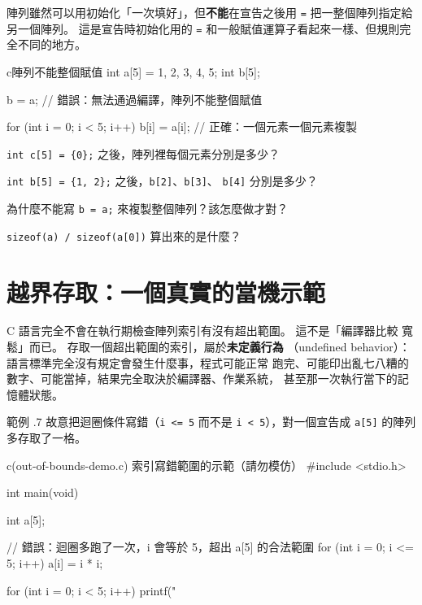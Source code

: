 陣列雖然可以用初始化「一次填好」，但\textbf{不能}在宣告之後用
\texttt{=} 把一整個陣列指定給另一個陣列。 這是宣告時初始化用的
\texttt{=} 和一般賦值運算子看起來一樣、但規則完全不同的地方。

\begin{code}{c}{陣列不能整個賦值}
int a[5] = {1, 2, 3, 4, 5};
int b[5];

b = a;   // 錯誤：無法通過編譯，陣列不能整個賦值

for (int i = 0; i < 5; i++) {
    b[i] = a[i];   // 正確：一個元素一個元素複製
}
\end{code}


\begin{drills}[label=drills:array-init-limits]
\item \texttt{int c[5] = \{0\};} 之後，陣列裡每個元素分別是多少？
\item \texttt{int b[5] = \{1, 2\};} 之後，\texttt{b[2]}、\texttt{b[3]}、
\texttt{b[4]} 分別是多少？
\item 為什麼不能寫 \texttt{b = a;} 來複製整個陣列？該怎麼做才對？
\item \texttt{sizeof(a) / sizeof(a[0])} 算出來的是什麼？
\end{drills}

\section{越界存取：一個真實的當機示範}
\label{sec:array-out-of-bounds}

C 語言完全不會在執行期檢查陣列索引有沒有超出範圍。 這不是「編譯器比較
寬鬆」而已。 存取一個超出範圍的索引，屬於\textbf{未定義行為}
（undefined behavior）：語言標準完全沒有規定會發生什麼事，程式可能正常
跑完、可能印出亂七八糟的數字、可能當掉，結果完全取決於編譯器、作業系統，
甚至那一次執行當下的記憶體狀態。

範例 \thechapter.7 故意把迴圈條件寫錯（\texttt{i <= 5} 而不是
\texttt{i < 5}），對一個宣告成 \texttt{a[5]} 的陣列多存取了一格。

\begin{example}{c}{(out-of-bounds-demo.c) 索引寫錯範圍的示範（請勿模仿）}
#include <stdio.h>

int main(void) {
    int a[5];

    // 錯誤：迴圈多跑了一次，i 會等於 5，超出 a[5] 的合法範圍
    for (int i = 0; i <= 5; i++) {
        a[i] = i * i;
    }

    for (int i = 0; i < 5; i++) {
        printf("%
    }
}
\end{example}

